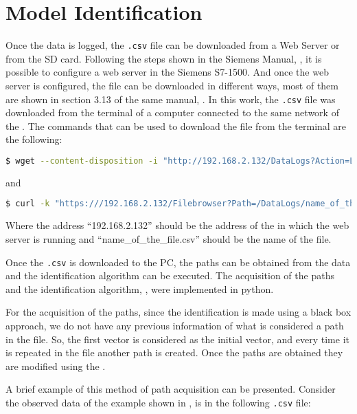 \section{Model Identification}
\label{sec:modIdent}
 Once the data is logged, the \verb|.csv| file can be downloaded from a Web Server or from the SD card. Following the steps shown in the Siemens Manual,
\cite{webserverSiemens}, it is possible to configure a web server in the Siemens
\PLC{} S7-1500. And once the web server is configured, the file can be downloaded in different
ways, most of them are shown in section 3.13 of the same manual, \cite{webserverSiemens}. In this work, the \verb|.csv| file was downloaded from the terminal of a computer connected to the same network of the \PLC{}.
The commands that can be used to download the file from the terminal are the following:
\vspace{-1cm}
\begin{lstlisting}[language=bash,numbers=none]
  $ wget --content-disposition -i "http://192.168.2.132/DataLogs?Action=LIST"
\end{lstlisting}
and
\vspace{-1cm}
\begin{lstlisting}[language=bash,numbers=none]
  $ curl -k "https:///192.168.2.132/Filebrowser?Path=/DataLogs/name_of_the_file.csv&RAW" -H "Referer: https://192.168.2.132/Portal/Portal.mwsl?PriNav=Filebrowser&Path=/DataLogs/"
\end{lstlisting}
Where the address ``192.168.2.132'' should be the address of the \PLC{} in which
the web server is running and ``name\_of\_the\_file.csv'' should be the name of the file.

Once the \verb|.csv| is downloaded to the PC, the paths can be obtained from the data and the identification algorithm can
be executed. The acquisition of the paths and the identification algorithm, , were
implemented in python.

For the acquisition of the paths, since the identification is
made using a black box approach, we do not have any previous information of what is
considered a path in the file. So, the first vector is considered as the initial
vector, and every time it is repeated in the file another path is created.
Once the paths are obtained they are modified using the
.

A brief example of this method of path acquisition can be presented. Consider the observed data of the example shown in , is in the following
\verb|.csv| file:

